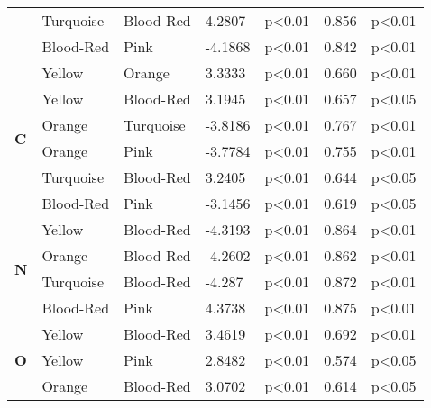\begin{longtable} { |p{0.5cm}| p{2cm}|p{2cm}|p{1.5cm}| p{1.7cm}|p{1cm}|p{1.5cm}|  }
    &Turquoise	&Blood-Red	&4.2807	&p<0.01	&0.856		&p<0.01\\
    &Blood-Red	&Pink		&-4.1868	&p<0.01	&0.842		&p<0.01\\
    \hline
    \hline
    \multirow{6}{*}{\textbf{C}}
    &Yellow		&Orange		&3.3333	&p<0.01	&0.660		&p<0.01\\
    &Yellow		&Blood-Red	&3.1945	&p<0.01	&0.657 		&p<0.05\\
    &Orange		&Turquoise	&-3.8186	&p<0.01	&0.767		&p<0.01\\
    &Orange		&Pink		&-3.7784	&p<0.01	&0.755		&p<0.01\\
    &Turquoise	&Blood-Red	&3.2405	&p<0.01	&0.644		&p<0.05\\
    &Blood-Red	&Pink		&-3.1456	&p<0.01	&0.619		&p<0.05\\
    \hline
    \hline
    \multirow{4}{*}{\textbf{N}}
    &Yellow		&Blood-Red	&-4.3193	&p<0.01	&0.864		&p<0.01\\
    &Orange		&Blood-Red	&-4.2602	&p<0.01	&0.862		&p<0.01\\
    &Turquoise	&Blood-Red	&-4.287	&p<0.01	&0.872		&p<0.01\\
    &Blood-Red	&Pink		&4.3738	&p<0.01	&0.875		&p<0.01\\
    \hline
    \hline
    \multirow{4}{*}{\textbf{O}}
    &Yellow		&Blood-Red	&3.4619	&p<0.01	&0.692		&p<0.01\\
    &Yellow		&Pink		&2.8482	&p<0.01	&0.574		&p<0.05\\
    &Orange		&Blood-Red	&3.0702	&p<0.01	&0.614		&p<0.05\\
    \hline
\end{longtable}

